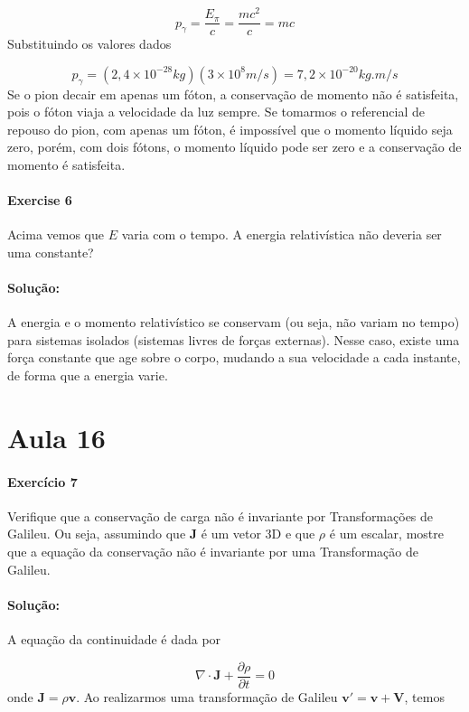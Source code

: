 \documentclass[10pt,a4paper]{article}
\begin{document}
\begin{equation}
p_{\gamma} = \frac{E_{\pi}}{c} = \frac{mc^2}{c} = mc
\end{equation}
Substituindo os valores dados 

\begin{equation}
p_{\gamma} = (2,4\times 10^{-28}\si{kg})(3\times 10^8 \unit{m/s}) = 7,2 \times 10^{-20}\si{kg.m/s}
\end{equation}
Se o pion decair em apenas um fóton, a conservação de momento não é satisfeita, pois o fóton viaja a velocidade da luz sempre. Se tomarmos o referencial de repouso do pion, com apenas um fóton, é impossível que o momento líquido seja zero, porém, com dois fótons, o momento líquido pode ser zero e a conservação de momento é satisfeita.

\paragraph{Exercise 6} Acima vemos que $E$ varia com o tempo. A energia relativística não deveria ser uma constante?

\paragraph{Solução:} A energia e o momento relativístico se conservam (ou seja, não variam no tempo) para sistemas isolados (sistemas livres de forças externas). Nesse caso, existe uma força constante que age sobre o corpo, mudando a sua velocidade a cada instante, de forma que a energia varie.

\section*{Aula 16}
\paragraph{Exercício 7} Verifique que a conservação de carga não é invariante por Transformações de Galileu. Ou seja, assumindo que \textbf{J} é um vetor 3D e que $\rho$ é um escalar, mostre que a equação da conservação não é invariante por uma Transformação de Galileu.

\paragraph{Solução:} A equação da continuidade é dada por

\begin{equation*}
	\nabla\cdot\mathbf{J} + \dfrac{\partial \rho}{\partial t} = 0
\end{equation*}
onde $ \mathbf{J} = \rho\mathbf{v} $. Ao realizarmos uma transformação de Galileu $ \mathbf{v'} = \mathbf{v} + \mathbf{V} $, temos
\end{document}
